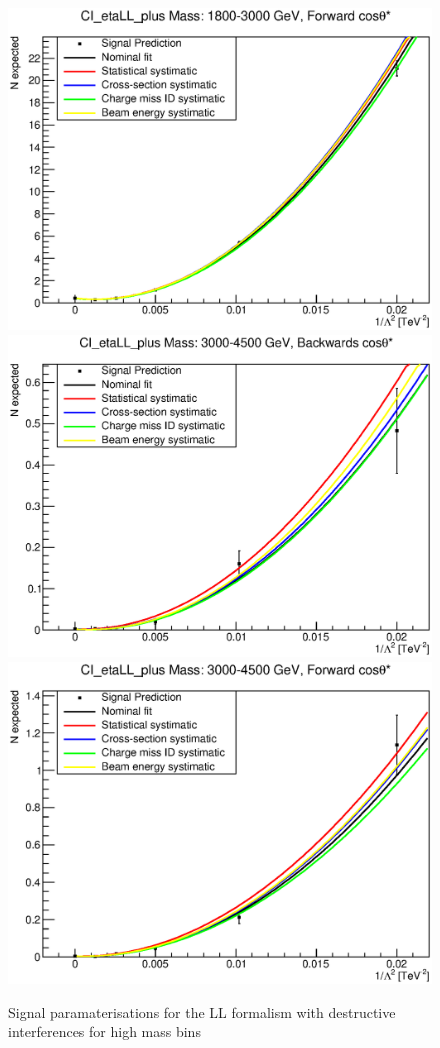 \begin{figure}[ht]
			\includegraphics[width=0.49\linewidth]{images/thesis_fits/CI_2D_etaLL_plus_Mass_1800-3000_GeV_CTS_0_1.eps}
			\includegraphics[width=0.49\linewidth]{images/thesis_fits/CI_2D_etaLL_plus_Mass_3000-4500_GeV_CTS_-1_0.eps}
			\includegraphics[width=0.49\linewidth]{images/thesis_fits/CI_2D_etaLL_plus_Mass_3000-4500_GeV_CTS_0_1.eps}
		\caption{Signal paramaterisations for the LL formalism with destructive interferences for high mass bins}
		\label{fig:parm_LL_p_2}
	\end{figure}














